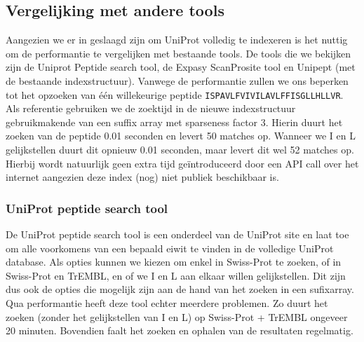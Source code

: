\subsection{Vergelijking met andere tools}\label{subsec:vergelijking-met-andere-tools}
Aangezien we er in geslaagd zijn om UniProt volledig te indexeren is het nuttig om de performantie te vergelijken met bestaande tools.
De tools die we bekijken zijn de Uniprot Peptide search tool, de Expasy ScanProsite tool en Unipept (met de bestaande indexstructuur).
Vanwege de performantie zullen we ons beperken tot het opzoeken van één willekeurige peptide \texttt{ISPAVLFVIVILAVLFFISGLLHLLVR}.
Als referentie gebruiken we de zoektijd in de nieuwe indexstructuur gebruikmakende van een suffix array met sparseness factor 3.
Hierin duurt het zoeken van de peptide 0.01 seconden en levert 50 matches op.
Wanneer we I en L gelijkstellen duurt dit opnieuw 0.01 seconden, maar levert dit wel 52 matches op.
Hierbij wordt natuurlijk geen extra tijd geïntroduceerd door een API call over het internet aangezien deze index (nog) niet publiek beschikbaar is.

\subsubsection{UniProt peptide search tool}
De UniProt peptide search tool\cite{uniprot_search_paper, uniprot_search_site} is een onderdeel van de UniProt site en laat toe om alle voorkomens van een bepaald eiwit te vinden in de volledige UniProt database.
Als opties kunnen we kiezen om enkel in Swiss-Prot te zoeken, of in Swiss-Prot en TrEMBL, en of we I en L aan elkaar willen gelijkstellen.
Dit zijn dus ook de opties die mogelijk zijn aan de hand van het zoeken in een sufixarray.
Qua performantie heeft deze tool echter meerdere problemen.
Zo duurt het zoeken (zonder het gelijkstellen van I en L) op Swiss-Prot + TrEMBL ongeveer 20 minuten.
Bovendien faalt het zoeken en ophalen van de resultaten regelmatig.


